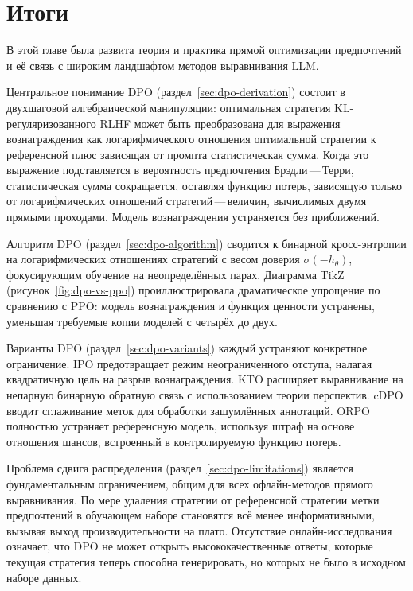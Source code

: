 \section{Итоги}
\label{sec:ch12-summary}

В этой главе была развита теория и практика прямой оптимизации предпочтений и её связь с широким ландшафтом методов выравнивания LLM.

Центральное понимание DPO (раздел~\ref{sec:dpo-derivation}) состоит в двухшаговой алгебраической манипуляции: оптимальная стратегия KL-регуляризованного RLHF может быть преобразована для выражения вознаграждения как логарифмического отношения оптимальной стратегии к референсной плюс зависящая от промпта статистическая сумма. Когда это выражение подставляется в вероятность предпочтения Брэдли\,---\,Терри, статистическая сумма сокращается, оставляя функцию потерь, зависящую только от логарифмических отношений стратегий\,---\,величин, вычислимых двумя прямыми проходами. Модель вознаграждения устраняется без приближений.

Алгоритм DPO (раздел~\ref{sec:dpo-algorithm}) сводится к бинарной кросс-энтропии на логарифмических отношениях стратегий с весом доверия $\sigma(-h_\theta)$, фокусирующим обучение на неопределённых парах. Диаграмма TikZ (рисунок~\ref{fig:dpo-vs-ppo}) проиллюстрировала драматическое упрощение по сравнению с PPO: модель вознаграждения и функция ценности устранены, уменьшая требуемые копии моделей с четырёх до двух.

Варианты DPO (раздел~\ref{sec:dpo-variants}) каждый устраняют конкретное ограничение. IPO предотвращает режим неограниченного отступа, налагая квадратичную цель на разрыв вознаграждения. KTO расширяет выравнивание на непарную бинарную обратную связь с использованием теории перспектив. cDPO вводит сглаживание меток для обработки зашумлённых аннотаций. ORPO полностью устраняет референсную модель, используя штраф на основе отношения шансов, встроенный в контролируемую функцию потерь.

Проблема сдвига распределения (раздел~\ref{sec:dpo-limitations}) является фундаментальным ограничением, общим для всех офлайн-методов прямого выравнивания. По мере удаления стратегии от референсной стратегии метки предпочтений в обучающем наборе становятся всё менее информативными, вызывая выход производительности на плато. Отсутствие онлайн-исследования означает, что DPO не может открыть высококачественные ответы, которые текущая стратегия теперь способна генерировать, но которых не было в исходном наборе данных.

